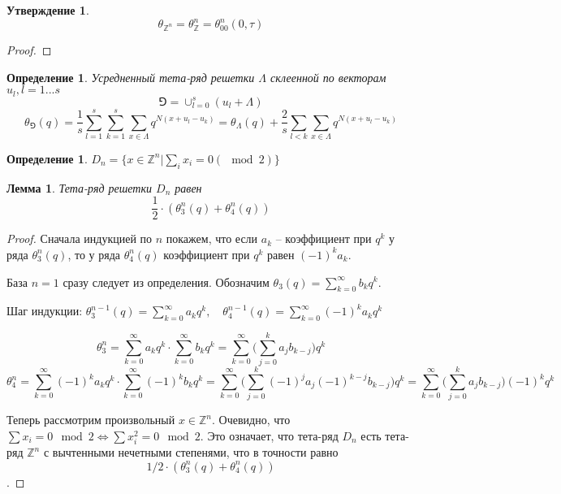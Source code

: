 \documentclass{article}
\newcommand{\ZZ}{\mathbb{Z}}
\theoremstyle{break}
\newtheorem{definition}[theorem]{Определение}
\newtheorem{claim}{Утверждение}[section]
\newtheorem{lemma}{Лемма}[section]
\begin{document}
\begin{claim}
	$$\theta_{\ZZ^n}=\theta_{\ZZ}^n = \theta_{00}^n(0, \tau)$$
\end{claim}
\begin{proof}
	
\end{proof}



\begin{definition}
	Усредненный тета-ряд решетки $\Lambda$ склеенной по векторам $u_l, l=1...s$
	$$
		\Game = \cup_{l=0}^s (u_l + \Lambda)
	$$
	$$
		\theta_{\Game}(q)=\frac{1}{s} \sum_{l=1}^s \sum_{k=1}^s 
			\sum_{x \in \Lambda} q^{N(x + u_l - u_k)}
		= \theta_{\Lambda}(q) + \frac{2}{s} \sum_{l < k} 
			\sum_{x \in \Lambda} q^{N(x + u_l - u_k)}
	$$
\end{definition}

\begin{definition}
	$D_n = \{x \in \ZZ^n | \sum_i x_i = 0 (\mod 2)\}$
\end{definition}


\begin{lemma}
	Тета-ряд решетки $D_n$ равен 
	$$
		\frac{1}{2} \cdot (\theta_3^n(q) + \theta_4^n(q))
	$$
\end{lemma}

\begin{proof}
	Сначала индукцией по $n$ покажем, что если $a_k$ -- коэффициент при $q^k$ у ряда $\theta_{3}^n(q)$, то у ряда $\theta_{4}^n(q)$ коэффициент при $q^k$ равен 
	$(-1)^k a_k$.
	
	База $n=1$ сразу следует из определения. Обозначим
	 $\theta_{3}(q)=\sum_{k=0}^\infty b_k q^k$. 
	
	Шаг индукции: $\theta_{3}^{n-1}(q) = \sum_{k=0}^\infty a_k q^k,
	\quad \theta_{4}^{n-1}(q)=\sum_{k=0}^\infty (-1)^k a_k q^k$
	
	$$
		\theta_{3}^{n} = \sum_{k=0}^\infty a_k q^k \cdot \sum_{k = 0}^\infty b_k q^k = 
		\sum_{k = 0}^\infty \Big( \sum_{j=0}^k a_j b_{k-j} \Big) q^k
	$$
	$$
			\theta_{4}^{n} = \sum_{k=0}^\infty (-1)^k a_k q^k \cdot \sum_{k = 0}^\infty (-1)^k b_k q^k = 
	\sum_{k = 0}^\infty \Big(  \sum_{j=0}^k (-1)^j a_j (-1)^{k-j} b_{k-j} \Big) q^k =
	\sum_{k = 0}^\infty \Big( \sum_{j=0}^k a_j b_{k-j} \Big) (-1)^k q^k
	$$
	
	Теперь рассмотрим произвольный $x \in \ZZ^n$. Очевидно, что 
	$\sum x_i = 0 \mod 2 \iff \sum x_i^2 = 0 \mod 2$. 
	Это означает, что тета-ряд $D_n$ есть тета-ряд $\ZZ^n$ с вычтенными нечетными степенями, что в точности равно $$1/2 \cdot (\theta_3^n (q) + \theta_4 ^n (q))$$.
\end{proof}
\end{document}
